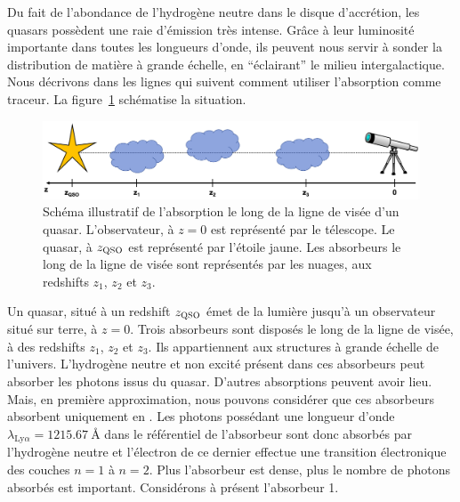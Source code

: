Du fait de l'abondance de l'hydrogène neutre dans le disque d'accrétion, les quasars possèdent une raie d'émission \lya{} très intense. Grâce à leur luminosité importante dans toutes les longueurs d'onde, ils peuvent nous servir à sonder la distribution de matière à grande échelle, en ``éclairant'' le milieu intergalactique.
Nous décrivons dans les lignes qui suivent comment utiliser l'absorption \lya{} comme traceur.
La figure~\ref{fig:schema_lya} schématise la situation.
\begin{figure}
  \centering
  \includegraphics[scale=0.4]{schema_lya}
  \caption{Schéma illustratif de l'absorption le long de la ligne de visée d'un quasar. L'observateur, à $z=0$ est représenté par le télescope. Le quasar, à $z_{\textsc{QSO}}$ est représenté par l'étoile jaune. Les absorbeurs le long de la ligne de visée sont représentés par les nuages, aux redshifts $z_{1}$, $z_{2}$ et $z_{3}$.}
  \label{fig:schema_lya}
\end{figure}
Un quasar, situé à un redshift $z_{\textsc{QSO}}$ émet de la lumière jusqu'à un observateur situé sur terre, à $z=0$. Trois absorbeurs sont disposés le long de la ligne de visée, à des redshifts $z_1$, $z_2$ et $z_3$. Ils appartiennent aux structures à grande échelle de l'univers. L'hydrogène neutre et non excité présent dans ces absorbeurs peut absorber les photons issus du quasar.
D'autres absorptions peuvent avoir lieu. Mais, en première approximation, nous pouvons considérer que ces absorbeurs absorbent uniquement en \lya{}.
Les photons possédant une longueur d'onde $\lambda_{\mathrm{Ly}\alpha} = \SI{1215.67}{\angstrom}$ dans le référentiel de l'absorbeur sont donc absorbés par l'hydrogène neutre et l'électron de ce dernier effectue une transition électronique des couches $n=1$ à $n=2$. Plus l'absorbeur est dense, plus le nombre de photons absorbés est important. Considérons à présent l'absorbeur 1.
